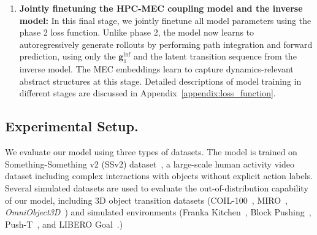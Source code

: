 \begin{enumerate}
\begin{equation}
\begin{aligned}
        & + \mathcal{L}(f_{\text{fwd}}(\boldsymbol{z}_{1:T-1}, \boldsymbol{g}_{1:T-1}^{\text{inf}}), \Delta \boldsymbol{g}_{1:T-1}^{\text{inf}}).
    \end{aligned}
    \end{equation}
    \item \textbf{Jointly finetuning the HPC-MEC coupling model and the inverse model:} In this final stage, we jointly finetune all model parameters using the phase 2 loss function. Unlike phase 2, the model now learns to autoregressively generate rollouts by performing path integration and forward prediction, using only the $\boldsymbol{g}_{1}^{\text{inf}}$ and the latent transition sequence from the inverse model. The MEC embeddings learn to capture dynamics-relevant abstract structures at this stage. Detailed descriptions of model training in different stages are discussed in Appendix~\ref{appendix:loss_function}.
\end{enumerate}

\subsection{Experimental Setup.}
We evaluate our model using three types of datasets. The model is trained on Something-Something v2 (SSv2) dataset~\citep{DBLP:journals/corr/GoyalKMMWKHFYMH17}, a large-scale human activity video dataset including complex interactions with objects without explicit action labels. Several simulated datasets are used to evaluate the out-of-distribution capability of our model, including 3D object transition datasets (COIL-100~\citep{nene1996columbia}, MIRO~\citep{kanezaki2018rotationnet},  \textit{OmniObject3D}~\citep{wu2023omniobject3d}) and simulated environments (Franka Kitchen~\citep{gupta2019relay}, Block Pushing~\citep{florence2022implicit}, Push-T~\citep{chi2023diffusion}, and LIBERO Goal~\citep{liu2023libero}.)